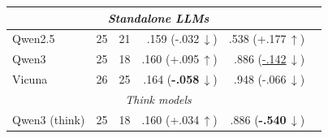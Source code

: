 \begin{table}[t]
{\begin{tabular}{lrrrrr}
\multicolumn{5}{c}{\textit{Standalone LLMs}} \\
\midrule
Qwen2.5 & 25 & 21 & .159 (\textcolor[HTML]{0072B2}{-.032\,$\downarrow$}) & .538 (\textcolor[HTML]{CC7A00}{+.177\,$\uparrow$}) \\
Qwen3 & 25 & 18 & .160 (\textcolor[HTML]{CC7A00}{+.095\,$\uparrow$}) & .886 (\textcolor[HTML]{0072B2}{\underline{-.142}\,$\downarrow$}) \\
Vicuna & 26 & 25 & .164 (\textcolor[HTML]{0072B2}{\textbf{-.058}\,$\downarrow$}) & .948 (\textcolor[HTML]{0072B2}{-.066\,$\downarrow$}) \\
\multicolumn{5}{c}{\textit{Think models}} \\
\midrule
Qwen3 (think) & 25 & 18 & .160 (\textcolor[HTML]{CC7A00}{+.034\,$\uparrow$}) & .886 (\textcolor[HTML]{0072B2}{\textbf{-.540}\,$\downarrow$}) \\
\bottomrule
\end{tabular}%
}
\end{table}
